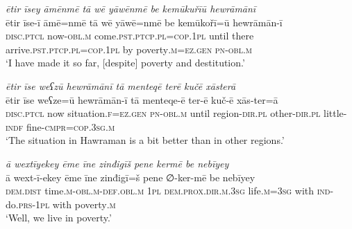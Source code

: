 \ea \label{ŽM.54}
\textit{ētir īsey āmēnmē tā wē yāwēnmē be kemūkuřīū hewrāmānī} \\ 
\gll ētir īse-ī āmē=nmē tā wē yāwē=nmē be kemūkořī=ū hewrāmān-ī \\ 
 \textsc{disc}.\textsc{ptcl} now\textsc{-obl}\textsc{.m} come\textsc{.pst}\textsc{.ptcp}\textsc{.pl}\textsc{=cop}\textsc{.\textsc{1pl}} until there arrive\textsc{.pst}\textsc{.ptcp}\textsc{.pl}\textsc{=cop}\textsc{.\textsc{1pl}} by poverty\textsc{.m}\textsc{=ez.gen} \textsc{pn}\textsc{-obl}\textsc{.m} \\ 
\glt `I have made it so far, [despite] poverty and destitution.'
\z 
 
\ea \label{ŽM.55}
\textit{ētir īse weʕzū hewrāmānī tā menteqē terē kučē xāsterā} \\ 
\gll ētir īse weʕze=ū hewrāmān-ī tā menteqe-ē ter-ē kuč-ē xās-ter=ā \\ 
 \textsc{disc}.\textsc{ptcl} now situation\textsc{.f}\textsc{=ez.gen} \textsc{pn}\textsc{-obl}\textsc{.m} until region\textsc{-dir}\textsc{.pl} other\textsc{-dir}\textsc{.pl} little\textsc{-indf} fine\textsc{-cmpr}\textsc{=cop}\textsc{.3sg}\textsc{.m} \\ 
\glt `The situation in Hawraman is a bit better than in other regions.'
\z 
 
\ea \label{ŽM.57}
\textit{ā wextīyekey ēme īne zinđigīš pene kermē be nebīyey} \\ 
\gll ā wext-ī-ekey ēme īne zinđigī=š pene ∅-ker-mē be nebīyey \\ 
 \textsc{dem.dist} time\textsc{.m}\textsc{-obl}\textsc{.m}\textsc{-def}\textsc{.obl}\textsc{.m} \textsc{1pl} \textsc{dem.prox}\textsc{.dir}\textsc{.m}\textsc{.3sg} life\textsc{.m}\textsc{=3sg} with \textsc{ind-}do\textsc{.prs}\textsc{-\textsc{1pl}} with poverty\textsc{.m} \\ 
\glt `Well, we live in poverty.'
\z 
 
